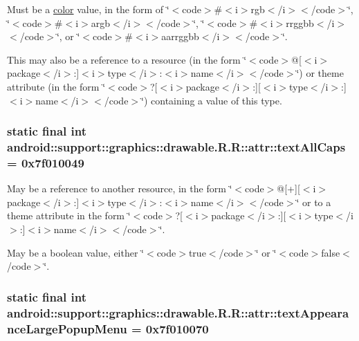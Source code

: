 Must be a \hyperlink{classandroid_1_1support_1_1graphics_1_1drawable_1_1_r_1_1color}{color} value, in the form of \char`\"{}$<$code$>$\#$<$i$>$rgb$<$/i$>$$<$/code$>$\char`\"{}, \char`\"{}$<$code$>$\#$<$i$>$argb$<$/i$>$$<$/code$>$\char`\"{}, \char`\"{}$<$code$>$\#$<$i$>$rrggbb$<$/i$>$$<$/code$>$\char`\"{}, or \char`\"{}$<$code$>$\#$<$i$>$aarrggbb$<$/i$>$$<$/code$>$\char`\"{}. 

This may also be a reference to a resource (in the form \char`\"{}$<$code$>$@\mbox{[}$<$i$>$package$<$/i$>$:\mbox{]}$<$i$>$type$<$/i$>$:$<$i$>$name$<$/i$>$$<$/code$>$\char`\"{}) or theme attribute (in the form \char`\"{}$<$code$>$?\mbox{[}$<$i$>$package$<$/i$>$:\mbox{]}\mbox{[}$<$i$>$type$<$/i$>$:\mbox{]}$<$i$>$name$<$/i$>$$<$/code$>$\char`\"{}) containing a value of this type. \hypertarget{classandroid_1_1support_1_1graphics_1_1drawable_1_1_r_1_1attr_36a7d71fd8e60a097e4409fb0d99b5ae}{
\subsubsection[{textAllCaps}]{\setlength{\rightskip}{0pt plus 5cm}static final int android::support::graphics::drawable.R.R::attr::textAllCaps = 0x7f010049}}
\label{classandroid_1_1support_1_1graphics_1_1drawable_1_1_r_1_1attr_36a7d71fd8e60a097e4409fb0d99b5ae}


May be a reference to another resource, in the form \char`\"{}$<$code$>$@\mbox{[}+\mbox{]}\mbox{[}$<$i$>$package$<$/i$>$:\mbox{]}$<$i$>$type$<$/i$>$:$<$i$>$name$<$/i$>$$<$/code$>$\char`\"{} or to a theme attribute in the form \char`\"{}$<$code$>$?\mbox{[}$<$i$>$package$<$/i$>$:\mbox{]}\mbox{[}$<$i$>$type$<$/i$>$:\mbox{]}$<$i$>$name$<$/i$>$$<$/code$>$\char`\"{}. 

May be a boolean value, either \char`\"{}$<$code$>$true$<$/code$>$\char`\"{} or \char`\"{}$<$code$>$false$<$/code$>$\char`\"{}. \hypertarget{classandroid_1_1support_1_1graphics_1_1drawable_1_1_r_1_1attr_edbd591c4879cc5d9c1eb50e3069328c}{
\subsubsection[{textAppearanceLargePopupMenu}]{\setlength{\rightskip}{0pt plus 5cm}static final int android::support::graphics::drawable.R.R::attr::textAppearanceLargePopupMenu = 0x7f010070}}
\label{classandroid_1_1support_1_1graphics_1_1drawable_1_1_r_1_1attr_edbd591c4879cc5d9c1eb50e3069328c}


